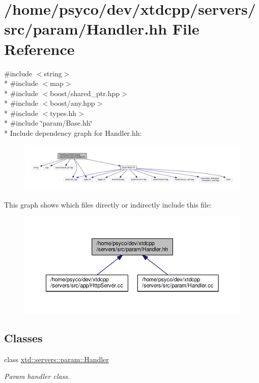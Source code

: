 \hypertarget{Handler_8hh}{}\section{/home/psyco/dev/xtdcpp/servers/src/param/\+Handler.hh File Reference}
\label{Handler_8hh}
{\ttfamily \#include $<$string$>$}\\*
{\ttfamily \#include $<$map$>$}\\*
{\ttfamily \#include $<$boost/shared\+\_\+ptr.\+hpp$>$}\\*
{\ttfamily \#include $<$boost/any.\+hpp$>$}\\*
{\ttfamily \#include $<$types.\+hh$>$}\\*
{\ttfamily \#include \char`\"{}param/\+Base.\+hh\char`\"{}}\\*
Include dependency graph for Handler.\+hh\+:
\nopagebreak
\begin{figure}[H]
\begin{center}
\leavevmode
\includegraphics[width=350pt]{Handler_8hh__incl}
\end{center}
\end{figure}
This graph shows which files directly or indirectly include this file\+:
\nopagebreak
\begin{figure}[H]
\begin{center}
\leavevmode
\includegraphics[width=350pt]{Handler_8hh__dep__incl}
\end{center}
\end{figure}
\subsection*{Classes}
\begin{DoxyCompactItemize}
\item 
class \hyperlink{classxtd_1_1servers_1_1param_1_1Handler}{xtd\+::servers\+::param\+::\+Handler}
\begin{DoxyCompactList}\small\item\em Param handler class. \end{DoxyCompactList}\end{DoxyCompactItemize}
